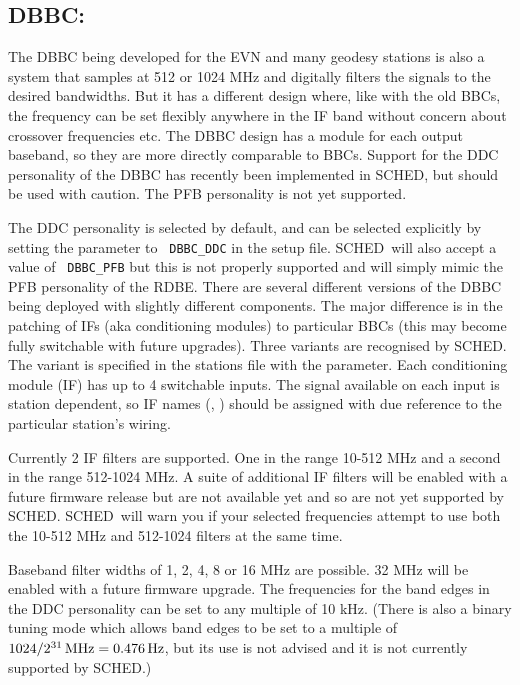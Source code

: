\documentclass{report}
\newcommand{\sched}{{\sc SCHED}}
\newcommand{\schedb}{{\sc SCHED~}}
\begin{document}
\subsection{\label{SSEC:DBBC}DBBC:}

The DBBC being developed for the EVN and many geodesy stations is also a
system that samples at 512 or 1024 MHz and digitally filters the signals
to the desired bandwidths. But it has a different design where, like
with the old BBCs, the frequency can be set flexibly anywhere in the IF
band without concern about crossover frequencies etc.  The DBBC design
has a module for each output baseband, so they are more directly
comparable to BBCs. Support for the DDC personality of the DBBC has
recently been implemented in \sched, but should be used with caution.
The PFB personality is not yet supported.

The DDC personality is selected by default, and can be selected
explicitly by setting the  parameter to {\tt
DBBC\_DDC} in the setup file. \schedb will also accept a value of {\tt
DBBC\_PFB} but this is not properly supported and will simply mimic the
PFB personality of the RDBE. There are several different versions of the
DBBC being deployed with slightly different components. The major
difference is in the patching of IFs (aka conditioning modules) to
particular BBCs (this may become fully switchable with future upgrades).
Three variants are recognised by \sched. The variant is specified in the
stations file with the  parameter.
Each conditioning module (IF) has up to 4 switchable inputs. The signal
available on each input is station dependent, so IF names (, ) should be
assigned with due reference to the particular station's wiring.

Currently 2 IF filters are supported. One in the range 10-512 MHz and a
second in the range 512-1024 MHz. A suite of additional IF filters will
be enabled with a future firmware release but are not available yet and
so are not yet supported by \sched. \schedb will warn you if your
selected frequencies attempt to use both the 10-512 MHz and 512-1024
filters at the same time.

Baseband filter widths of 1, 2, 4, 8 or 16 MHz are possible. 32 MHz will
be enabled with a future firmware upgrade. The frequencies for the band
edges in the DDC personality can be set to any multiple of 10 kHz.
(There is also a binary tuning mode which allows band edges to be set to
a multiple of $1024/2^{31} \,{\rm MHz} = 0.476 \,{\rm Hz}$, but its use
is not advised and it is not currently supported by \sched.)
\end{document}
